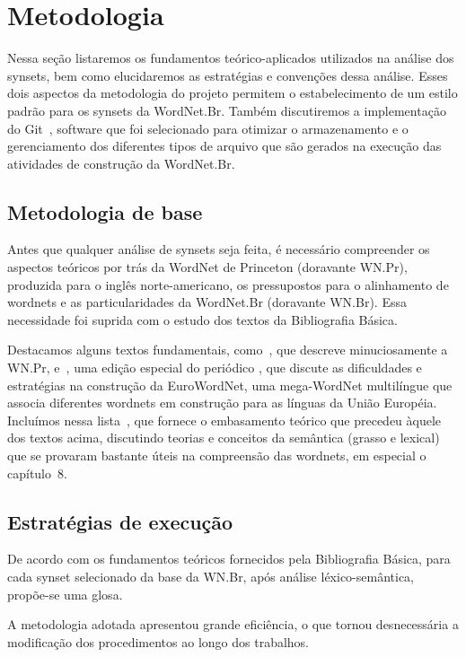\chapter{Metodologia}

Nessa seção listaremos os fundamentos teórico-aplicados utilizados na análise
dos synsets, bem como elucidaremos as estratégias e convenções dessa análise.
Esses dois aspectos da metodologia do projeto permitem o estabelecimento de um
estilo padrão para os synsets da WordNet.Br. Também discutiremos a
implementação do Git~\cite{git}, software que foi selecionado para otimizar o
armazenamento e o gerenciamento dos diferentes tipos de arquivo que são gerados
na execução das atividades de construção da WordNet.Br.

\section{Metodologia de base}

Antes que qualquer análise de synsets seja feita, é necessário compreender os
aspectos teóricos por trás da WordNet de Princeton (doravante WN.Pr), produzida
para o inglês norte-americano, os pressupostos para o alinhamento de wordnets e
as particularidades da WordNet.Br (doravante WN.Br). Essa necessidade foi
suprida com o estudo dos textos da Bibliografia Básica.

Destacamos alguns textos fundamentais, como~, que descreve
minuciosamente a WN.Pr, e~, uma edição especial do periódico
, que discute as dificuldades e
estratégias na construção da EuroWordNet, uma mega-WordNet multilíngue que
associa diferentes wordnets em construção para as línguas da União Européia.
Incluímos nessa lista~, que fornece o embasamento teórico
que precedeu àquele dos textos acima, discutindo teorias e conceitos da
semântica (grasso e lexical) que se provaram bastante úteis na compreensão das
wordnets, em especial o capítulo~8.

\section{Estratégias de execução}

De acordo com os fundamentos teóricos fornecidos pela Bibliografia Básica, para
cada synset selecionado da base da WN.Br, após análise léxico-semântica,
propõe-se uma glosa.

A metodologia adotada apresentou grande eficiência, o que tornou desnecessária a
modificação dos procedimentos ao longo dos trabalhos.

